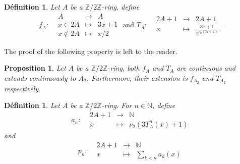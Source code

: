 \documentclass[12pt,a4paper]{article}
\newtheorem{prop}[lem]{Proposition}
\newtheorem{defi}[lem]{Définition}
\newcommand{\fonction}[5]{\displaystyle#1:\begin{array}{l|rcl}
& \displaystyle #2 & \longrightarrow & \displaystyle #3 \\
    & \displaystyle #4 & \longmapsto & \displaystyle #5 \end{array}}
\newcommand{\fonctiondeux}[7]{\displaystyle#1:\begin{array}{l|rcl}
& \displaystyle #2 & \longrightarrow & \displaystyle #3 \\
    & \displaystyle #4 & \longmapsto & \displaystyle #5 \\
     & \displaystyle #6 & \longmapsto & \displaystyle #7\end{array}}
\def\NN{\mathbb{N}}
\def\ZZ{\mathbb{Z}}
\begin{document}
\begin{defi}\label{def:ring_define}  Let $A$ be a  $\ZZ/2\ZZ$-ring, define
$$ \fonctiondeux{f_A}{A}{A}{x\in 2A}{3x+1}{x\notin 2A}{x/2} \text{ and }\fonction{T_A}{2A+1}{2A+1}{x}{\frac{3x+1}{2^{\nu_2(3x+1)}}}.$$
\end{defi}
The proof of the following property is left to the reader.
\begin{prop}\label{prop:ring_both_continuous_extends} Let $A$ be a $\ZZ/2\ZZ$-ring, both $f_A$ and $T_A$ are continuous and extends continuously to $A_2$. Furthermore, their extension is $f_{A_2}$ and $T_{A_2}$ respectively.
\end{prop}

\begin{defi}\label{def:ring_define_2} Let $A$ be a $\ZZ/2\ZZ$-ring. 
For $n\in \NN$, define $$\fonction{a_n}{2A+1}{\NN}{x}{\nu_2(3 T^n_A(x)+1)}$$ and 
$$\fonction{p_n}{2A+1}{\NN}{x}{\sum_{k<n}a_k(x)}$$

\end{defi}
\end{document}
